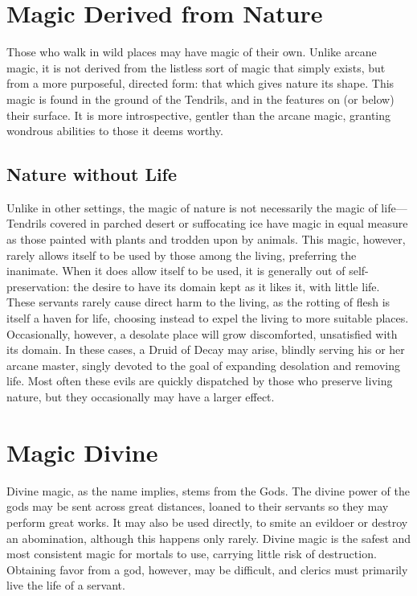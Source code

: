 \begin{multicols}{2}

\section{Magic Derived from Nature}
Those who walk in wild places may have magic of their own.
Unlike arcane magic, it is not derived from the listless sort of magic that simply exists, but from a more purposeful, directed form: that which gives nature its shape.
This magic is found in the ground of the Tendrils, and in the features on (or below) their surface.
It is more introspective, gentler than the arcane magic, granting wondrous abilities to those it deems worthy. 

\subsection{Nature without Life}
Unlike in other settings, the magic of nature is not necessarily the magic of life---Tendrils covered in parched desert or suffocating ice have magic in equal measure as those painted with plants and trodden upon by animals.
This magic, however, rarely allows itself to be used by those among the living, preferring the inanimate.
When it does allow itself to be used, it is generally out of self-preservation: the desire to have its domain kept as it likes it, with little life.
These servants rarely cause direct harm to the living, as the rotting of flesh is itself a haven for life, choosing instead to expel the living to more suitable places.
\label{druidofdecay}
Occasionally, however, a desolate place will grow discomforted, unsatisfied with its domain.
In these cases, a Druid of Decay may arise, blindly serving his or her arcane master, singly devoted to the goal of expanding desolation and removing life.
Most often these evils are quickly dispatched by those who preserve living nature, but they occasionally may have a larger effect.

\section{Magic Divine}
Divine magic, as the name implies, stems from the Gods.
The divine power of the gods may be sent across great distances, loaned to their servants so they may perform great works.
It may also be used directly, to smite an evildoer or destroy an abomination, although this happens only rarely.
Divine magic is the safest and most consistent magic for mortals to use, carrying little risk of destruction.
Obtaining favor from a god, however, may be difficult, and clerics must primarily live the life of a servant.

\end{multicols}
 

